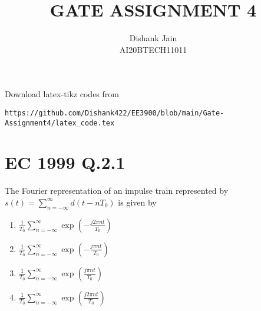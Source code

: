 \documentclass[journal,12pt,twocolumn]{IEEEtran}
\begin{document}
     \def\centbox#1{\makebox[0in]{#1}}
     \def\topbox#1{\raisebox{-\baselineskip}[0in][0in]{#1}}
     \def\midbox#1{\raisebox{-0.5\baselineskip}[0in][0in]{#1}}
\vspace{3cm}
\title{GATE ASSIGNMENT 4}
\author{Dishank Jain \\ AI20BTECH11011}
\maketitle
\newpage
\bigskip
\renewcommand{\thefigure}{\theenumi}
\renewcommand{\thetable}{\theenumi}
Download latex-tikz codes from
%
\begin{lstlisting}
https://github.com/Dishank422/EE3900/blob/main/Gate-Assignment4/latex_code.tex
\end{lstlisting}
%
\section{EC 1999 Q.2.1}
The Fourier representation of an impulse train represented by $s(t) = \sum_{n=-\infty}^{\infty}d(t-nT_0)$ is given by
\begin{enumerate}[label=(\alph*)]
\setlength\itemsep{0.5em}
    \item $\frac{1}{T_0}\sum_{n=-\infty}^{\infty}\exp\left(-\frac{j2\pi nt}{T_0}\right)$
    \item $\frac{1}{T_0}\sum_{n=-\infty}^{\infty}\exp\left(-\frac{j\pi nt}{T_0}\right)$
    \item $\frac{1}{T_0}\sum_{n=-\infty}^{\infty}\exp\left(\frac{j\pi nt}{T_0}\right)$
    \item $\frac{1}{T_0}\sum_{n=-\infty}^{\infty}\exp\left(\frac{j2\pi nt}{T_0}\right)$
\end{enumerate}
\end{document}
